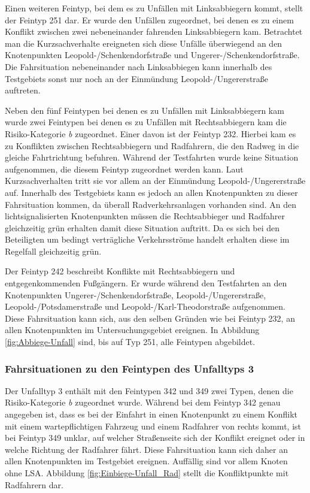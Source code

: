 Einen weiteren Feintyp, bei dem es zu Unfällen mit Linksabbiegern kommt, stellt der Feintyp 251 dar. Er wurde den Unfällen zugeordnet, bei denen es zu einem Konflikt zwischen zwei nebeneinander fahrenden Linksabbiegern kam. Betrachtet man die Kurzsachverhalte ereigneten sich diese Unfälle überwiegend an den Knotenpunkten Leopold-/Schenkendorfstraße und Ungerer-/Schenkendorfstraße. Die Fahrsituation nebeneinander nach Linksabbiegen kann innerhalb des Testgebiets sonst nur noch an der Einmündung Leopold-/Ungererstraße auftreten.

Neben den fünf Feintypen bei denen es zu Unfällen mit Linksabbiegern kam wurde zwei Feintypen bei denen es zu Unfällen mit Rechtsabbiegern kam die Risiko-Kategorie \textit{b} zugeordnet. Einer davon ist der Feintyp 232. Hierbei kam es zu Konflikten zwischen Rechtsabbiegern und Radfahrern, die den Radweg in die gleiche Fahrtrichtung befuhren. Während der Testfahrten wurde keine Situation aufgenommen, die diesem Feintyp zugeordnet werden kann. Laut Kurzsachverhalten tritt sie vor allem an der Einmündung Leopold-/Ungererstraße auf. Innerhalb des Testgebiets kann es jedoch an allen Knotenpunkten zu dieser Fahrsituation kommen, da überall Radverkehrsanlagen vorhanden sind. An den lichtsignalisierten Knotenpunkten müssen die Rechtsabbieger und Radfahrer gleichzeitig grün erhalten damit diese Situation auftritt. Da es sich bei den Beteiligten um bedingt verträgliche Verkehrsströme handelt erhalten diese im Regelfall gleichzeitig grün.

Der Feintyp 242 beschreibt Konflikte mit Rechtsabbiegern und entgegenkommenden Fußgängern. Er wurde während den Testfahrten an den Knotenpunkten Ungerer-/Schenkendorfstraße, Leopold-/Ungererstraße, Leopold-/Potsdamerstraße und Leopold-/Karl-Theodorstraße aufgenommen. Diese Fahrsituation kann sich, aus den selben Gründen wie bei Feintyp 232, an allen Knotenpunkten im Untersuchungsgebiet ereignen. In Abbildung \ref{fig:Abbiege-Unfall} sind, bis auf Typ 251, alle Feintypen abgebildet.

\subsubsection{Fahrsituationen zu den Feintypen des Unfalltyps 3}
Der Unfalltyp 3 enthält mit den Feintypen 342 und 349 zwei Typen, denen die Risiko-Kategorie \textit{b} zugeordnet wurde. Während bei dem Feintyp 342 genau angegeben ist, dass es bei der Einfahrt in einen Knotenpunkt zu einem Konflikt mit einem wartepflichtigen Fahrzeug und einem Radfahrer von rechts kommt, ist bei Feintyp 349 unklar, auf welcher Straßenseite sich der Konflikt ereignet oder in welche Richtung der Radfahrer fährt. Diese Fahrsituation kann sich daher an allen Knotenpunkten im Testgebiet ereignen. Auffällig sind vor allem Knoten ohne \ac{LSA}. Abbildung \ref{fig:Einbiege-Unfall_Rad} stellt die Konfliktpunkte mit Radfahrern dar.

